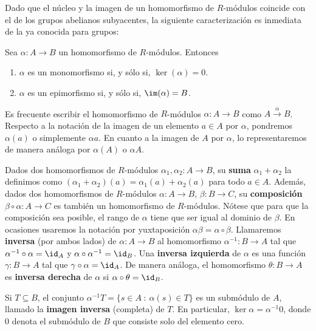 Dado que el núcleo y la imagen de un homomorfismo de \(R\)-módulos coincide con el
de los grupos abelianos subyacentes, la siguiente caracterización es inmediata de
la ya conocida para grupos:

\begin{proposicion}
	Sea \(\alpha: A \to B\) un homomorfismo de \(R\)-módulos. Entonces
	\begin{enumerate}
		\item \(\alpha\) es un monomorfismo si, y sólo si, \(\ker(\alpha) = 0\).
		\item \(\alpha\) es un epimorfismo si, y sólo si, \(\im(\alpha) = B\).
	\end{enumerate}
\end{proposicion}

Es frecuente escribir el homomorfismo de \(R\)-módulos \(\alpha: A \rightarrow B\)
como \(A \xrightarrow{\alpha}B\). Respecto a la notación de la imagen de un elemento
\(a \in A\) por \(\alpha\), pondremos \(\alpha(a)\) o simplemente \(\alpha a\). En cuanto
a la imagen de \(A\) por \(\alpha\), lo representaremos de manera análoga por
\(\alpha(A)\) o \(\alpha A\).

Dados dos homomorfismos de \(R\)-módulos
\(\alpha_{1}, \alpha_{2} : A \rightarrow B\), su \textbf{suma}
\(\alpha_{1} + \alpha_{2}\) la definimos como
\((\alpha_{1} + \alpha_{2})(a) = \alpha_{1}(a) + \alpha_{2}(a)\) para todo
\(a \in A\). Además, dados dos homomorfismos de \(R\)-módulos
\(\alpha: A \rightarrow B\), \(\beta: B \rightarrow C\), su \textbf{composición} \(\beta
\circ \alpha: A \rightarrow C\) es también un homomorfismo de \(R\)-módulos. Nótese
que para que la composición sea posible, el rango de \(\alpha\) tiene que ser igual
al dominio de \(\beta\). En ocasiones usaremos la notación por yuxtaposición
\(\alpha\beta = \alpha \circ \beta\). Llamaremos \textbf{inversa} (por ambos lados)
de \(\alpha : A \rightarrow B\) al homomorfismo \(\alpha^{-1}: B \rightarrow A\) tal
que \(\alpha^{-1}\circ \alpha = \id_{A}\) y \(\alpha \circ \alpha^{-1}= \id_{B}\). Una
\textbf{inversa izquierda} de \(\alpha\) es una función \(\gamma: B \rightarrow A\)
tal que \(\gamma \circ \alpha = \id_{A}\). De manera análoga, el homomorfismo
\(\theta : B \to A\) es \textbf{inversa derecha} de \(\alpha\) si \(\alpha \circ \theta
= \id_{B}\).

Si \(T \subseteq B\), el conjunto
\(\alpha^{-1}T = \{ s \in A \ : \ \alpha(s) \in T \}\) es un submódulo de \(A\), llamado
la \textbf{imagen inversa} (completa) de \(T\). En particular,
\(\ker \alpha = \alpha^{-1}0\), donde \(0\) denota el submódulo de \(B\) que consiste solo
del elemento cero.

